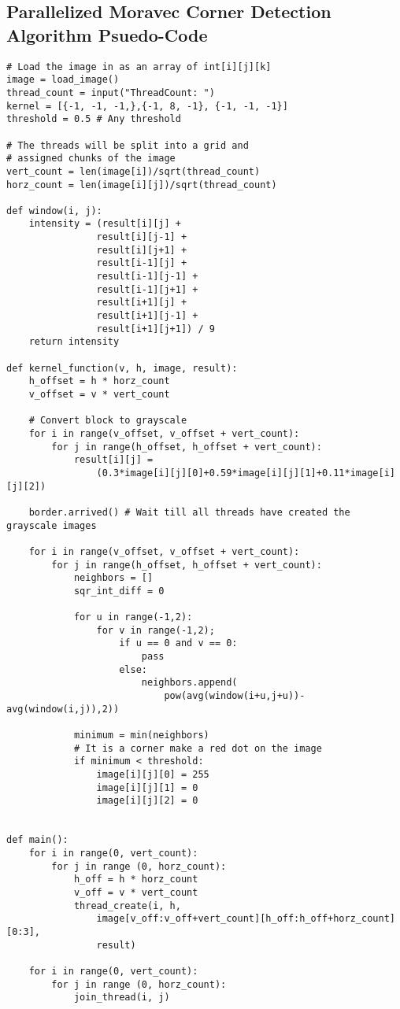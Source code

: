 \documentclass{article}
\begin{document}
        \subsection{Parallelized Moravec Corner Detection Algorithm Psuedo-Code}
                \begin{lstlisting}
# Load the image in as an array of int[i][j][k]
image = load_image()
thread_count = input("ThreadCount: ")
kernel = [{-1, -1, -1,},{-1, 8, -1}, {-1, -1, -1}]
threshold = 0.5 # Any threshold

# The threads will be split into a grid and 
# assigned chunks of the image
vert_count = len(image[i])/sqrt(thread_count)
horz_count = len(image[i][j])/sqrt(thread_count)

def window(i, j):
    intensity = (result[i][j] + 
                result[i][j-1] + 
                result[i][j+1] +
                result[i-1][j] + 
                result[i-1][j-1] + 
                result[i-1][j+1] +
                result[i+1][j] + 
                result[i+1][j-1] + 
                result[i+1][j+1]) / 9
    return intensity

def kernel_function(v, h, image, result):
    h_offset = h * horz_count
    v_offset = v * vert_count
    
    # Convert block to grayscale
    for i in range(v_offset, v_offset + vert_count):
        for j in range(h_offset, h_offset + vert_count):
            result[i][j] = 
                (0.3*image[i][j][0]+0.59*image[i][j][1]+0.11*image[i][j][2])
    
    border.arrived() # Wait till all threads have created the grayscale images
    
    for i in range(v_offset, v_offset + vert_count):
        for j in range(h_offset, h_offset + vert_count):
            neighbors = []
            sqr_int_diff = 0
            
            for u in range(-1,2):   
                for v in range(-1,2);
                    if u == 0 and v == 0:
                        pass
                    else:
                        neighbors.append(
                            pow(avg(window(i+u,j+u))-avg(window(i,j)),2))
            
            minimum = min(neighbors)
            # It is a corner make a red dot on the image
            if minimum < threshold:
                image[i][j][0] = 255
                image[i][j][1] = 0
                image[i][j][2] = 0
                    

def main():
    for i in range(0, vert_count):
        for j in range (0, horz_count):
            h_off = h * horz_count
            v_off = v * vert_count
            thread_create(i, h, 
                image[v_off:v_off+vert_count][h_off:h_off+horz_count][0:3], 
                result)
                
    for i in range(0, vert_count):
        for j in range (0, horz_count):
            join_thread(i, j)

        \end{lstlisting}
        \pagebreak
        
\end{document}

